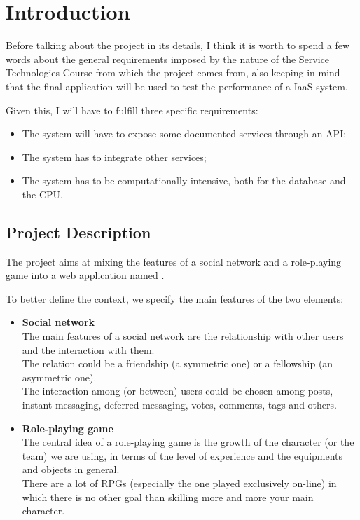 \chapter{Introduction}
	Before talking about the project in its details, I think it is worth to spend a few words about the general 
	requirements imposed by the nature of the Service Technologies Course from which the project comes from, also keeping in mind that the final application will be used to test the performance of a IaaS system.

	Given this, I will have to fulfill three specific requirements:
	\begin{itemize}
		\item The system will have to expose some documented services through an API;
		\item The system has to integrate other services;
		\item The system has to be computationally intensive, both for the database and the CPU.
	\end{itemize}
	\section{Project Description}
		The project aims at mixing the features of a social network and a role-playing game 
		into a web application named \SocialBattle.

		To better define the context, we specify the main features of the two elements:
		\begin{itemize}
			\item \textbf{Social network}\\
			The main features of a social network are
			the relationship with other users and 
			the interaction with them.\\
			The relation could be a friendship (a symmetric one) or a fellowship (an asymmetric one).\\
			The interaction among (or between) users could be chosen among posts, instant messaging, 
			deferred messaging, votes, comments, tags and others.
			\item \textbf{Role-playing game}\\
			The central idea of a role-playing game is the growth of the character (or the team) we 
			are using, in terms of the level of experience and the equipments and objects in general.\\
			There are a lot of RPGs (especially the one played exclusively on-line) in which there is 
			no other goal than skilling more and more your main character.
		\end{itemize}

